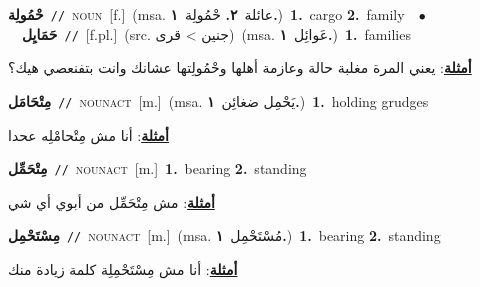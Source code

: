 \documentclass[10pt,a4paper,twoside]{article} %
\begin{document}
\begin{multicols}{2}
{\setlength\topsep{0pt}\textbf{\foreignlanguage{arabic}{حْمُولِة}}\ {\color{gray}\texttt{//}\color{black}}\ \textsc{noun}\ [f.]\ \color{gray}(msa. \foreignlanguage{arabic}{عائلة}~\foreignlanguage{arabic}{\textbf{٢.}}  \foreignlanguage{arabic}{حْمُولِة}~\foreignlanguage{arabic}{\textbf{١.}})\color{black}\ \textbf{1.}~cargo  \textbf{2.}~family\ \ $\bullet$\ \ \setlength\topsep{0pt}\textbf{\foreignlanguage{arabic}{حَمَايِل}}\ {\color{gray}\texttt{//}\color{black}}\ [f.pl.]\ (src. \color{gray}\foreignlanguage{arabic}{جنين > قرى}\color{black})\ \color{gray}(msa. \foreignlanguage{arabic}{عَوائِل}~\foreignlanguage{arabic}{\textbf{١.}})\color{black}\ \textbf{1.}~families\  \begin{flushright}\color{gray}\foreignlanguage{arabic}{\textbf{\underline{\foreignlanguage{arabic}{أمثلة}}}: يعني المرة مغلبة حالة وعازمة أهلها وحْمُولِتها عشانك وانت بتفنعصي هيك؟}\end{flushright}\color{black}} \vspace{2mm}

{\setlength\topsep{0pt}\textbf{\foreignlanguage{arabic}{مِتْحَامَل}}\ {\color{gray}\texttt{//}\color{black}}\ \textsc{noun\textunderscore act}\ [m.]\ \color{gray}(msa. \foreignlanguage{arabic}{يَحْمِل ضغائِن}~\foreignlanguage{arabic}{\textbf{١.}})\color{black}\ \textbf{1.}~holding grudges\  \begin{flushright}\color{gray}\foreignlanguage{arabic}{\textbf{\underline{\foreignlanguage{arabic}{أمثلة}}}: أنا مش مِتْحامْلِه عحدا}\end{flushright}\color{black}} \vspace{2mm}

{\setlength\topsep{0pt}\textbf{\foreignlanguage{arabic}{مِتْحَمِّل}}\ {\color{gray}\texttt{//}\color{black}}\ \textsc{noun\textunderscore act}\ [m.]\ \textbf{1.}~bearing  \textbf{2.}~standing\  \begin{flushright}\color{gray}\foreignlanguage{arabic}{\textbf{\underline{\foreignlanguage{arabic}{أمثلة}}}: مش مِتْحَمِّل من أبوي أي شي}\end{flushright}\color{black}} \vspace{2mm}

{\setlength\topsep{0pt}\textbf{\foreignlanguage{arabic}{مِسْتَحْمِل}}\ {\color{gray}\texttt{//}\color{black}}\ \textsc{noun\textunderscore act}\ [m.]\ \color{gray}(msa. \foreignlanguage{arabic}{مُسْتَحْمِل}~\foreignlanguage{arabic}{\textbf{١.}})\color{black}\ \textbf{1.}~bearing  \textbf{2.}~standing\  \begin{flushright}\color{gray}\foreignlanguage{arabic}{\textbf{\underline{\foreignlanguage{arabic}{أمثلة}}}: أنا مش مِسْتَحْمِلِة كلمة زيادة منك}\end{flushright}\color{black}} \vspace{2mm}


\end{multicols}
\end{document}
